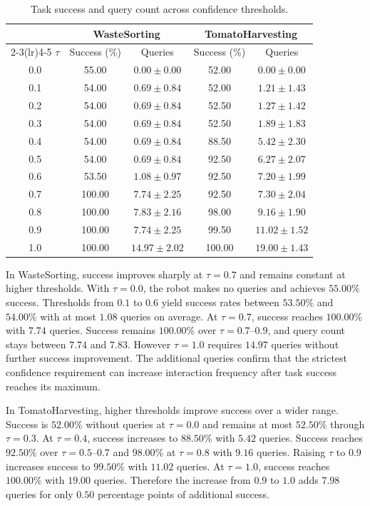 \begin{table}[t]
\centering
\caption{Task success and query count across confidence thresholds.}
\label{tab:threshold_results}
\small
\setlength{\tabcolsep}{1pt}
\begin{tabular*}{\columnwidth}{@{\extracolsep{\fill}}ccccc@{}}
\toprule
 & \multicolumn{2}{c}{WasteSorting} & \multicolumn{2}{c}{TomatoHarvesting} \\
\cmidrule(lr){2-3}\cmidrule(lr){4-5}
$\tau$ & Success (\%) & Queries & Success (\%) & Queries \\
\midrule
0.0 & 55.00 & $0.00 \pm 0.00$ & 52.00 & $0.00 \pm 0.00$ \\
0.1 & 54.00 & $0.69 \pm 0.84$ & 52.00 & $1.21 \pm 1.43$ \\
0.2 & 54.00 & $0.69 \pm 0.84$ & 52.50 & $1.27 \pm 1.42$ \\
0.3 & 54.00 & $0.69 \pm 0.84$ & 52.50 & $1.89 \pm 1.83$ \\
0.4 & 54.00 & $0.69 \pm 0.84$ & 88.50 & $5.42 \pm 2.30$ \\
0.5 & 54.00 & $0.69 \pm 0.84$ & 92.50 & $6.27 \pm 2.07$ \\
0.6 & 53.50 & $1.08 \pm 0.97$ & 92.50 & $7.20 \pm 1.99$ \\
0.7 & 100.00 & $7.74 \pm 2.25$ & 92.50 & $7.30 \pm 2.04$ \\
0.8 & 100.00 & $7.83 \pm 2.16$ & 98.00 & $9.16 \pm 1.90$ \\
0.9 & 100.00 & $7.74 \pm 2.25$ & 99.50 & $11.02 \pm 1.52$ \\
1.0 & 100.00 & $14.97 \pm 2.02$ & 100.00 & $19.00 \pm 1.43$ \\
\bottomrule
\end{tabular*}
\end{table}


In WasteSorting, success improves sharply at $\tau=0.7$ and remains constant at higher thresholds. With $\tau=0.0$, the robot makes no queries and achieves $55.00\%$ success. Thresholds from $0.1$ to $0.6$ yield success rates between $53.50\%$ and $54.00\%$ with at most $1.08$ queries on average. At $\tau=0.7$, success reaches $100.00\%$ with $7.74$ queries. Success remains $100.00\%$ over $\tau=0.7$--$0.9$, and query count stays between $7.74$ and $7.83$. However $\tau=1.0$ requires $14.97$ queries without further success improvement. The additional queries confirm that the strictest confidence requirement can increase interaction frequency after task success reaches its maximum.

In TomatoHarvesting, higher thresholds improve success over a wider range. Success is $52.00\%$ without queries at $\tau=0.0$ and remains at most $52.50\%$ through $\tau=0.3$. At $\tau=0.4$, success increases to $88.50\%$ with $5.42$ queries. Success reaches $92.50\%$ over $\tau=0.5$--$0.7$ and $98.00\%$ at $\tau=0.8$ with $9.16$ queries. Raising $\tau$ to $0.9$ increases success to $99.50\%$ with $11.02$ queries. At $\tau=1.0$, success reaches $100.00\%$ with $19.00$ queries. Therefore the increase from $0.9$ to $1.0$ adds $7.98$ queries for only $0.50$ percentage points of additional success.

